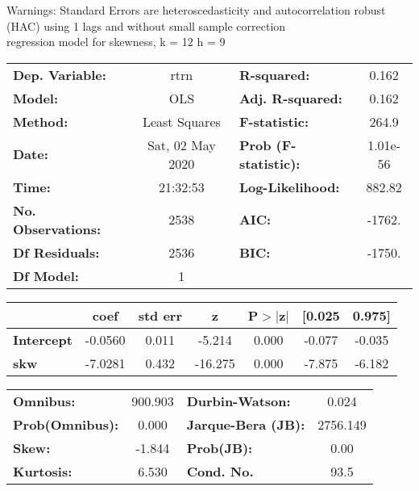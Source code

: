 Warnings: \newline
 [1] Standard Errors are heteroscedasticity and autocorrelation robust (HAC) using 1 lags and without small sample correction\\ 

regression model for skewness, k = 12 h = 9\begin{center}
\begin{tabular}{lclc}
\toprule
\textbf{Dep. Variable:}    &       rtrn       & \textbf{  R-squared:         } &     0.162   \\
\textbf{Model:}            &       OLS        & \textbf{  Adj. R-squared:    } &     0.162   \\
\textbf{Method:}           &  Least Squares   & \textbf{  F-statistic:       } &     264.9   \\
\textbf{Date:}             & Sat, 02 May 2020 & \textbf{  Prob (F-statistic):} &  1.01e-56   \\
\textbf{Time:}             &     21:32:53     & \textbf{  Log-Likelihood:    } &    882.82   \\
\textbf{No. Observations:} &        2538      & \textbf{  AIC:               } &    -1762.   \\
\textbf{Df Residuals:}     &        2536      & \textbf{  BIC:               } &    -1750.   \\
\textbf{Df Model:}         &           1      & \textbf{                     } &             \\
\bottomrule
\end{tabular}
\begin{tabular}{lcccccc}
                   & \textbf{coef} & \textbf{std err} & \textbf{z} & \textbf{P$> |$z$|$} & \textbf{[0.025} & \textbf{0.975]}  \\
\midrule
\textbf{Intercept} &      -0.0560  &        0.011     &    -5.214  &         0.000        &       -0.077    &       -0.035     \\
\textbf{skw}       &      -7.0281  &        0.432     &   -16.275  &         0.000        &       -7.875    &       -6.182     \\
\bottomrule
\end{tabular}
\begin{tabular}{lclc}
\textbf{Omnibus:}       & 900.903 & \textbf{  Durbin-Watson:     } &    0.024  \\
\textbf{Prob(Omnibus):} &   0.000 & \textbf{  Jarque-Bera (JB):  } & 2756.149  \\
\textbf{Skew:}          &  -1.844 & \textbf{  Prob(JB):          } &     0.00  \\
\textbf{Kurtosis:}      &   6.530 & \textbf{  Cond. No.          } &     93.5  \\
\bottomrule
\end{tabular}
\end{center}


